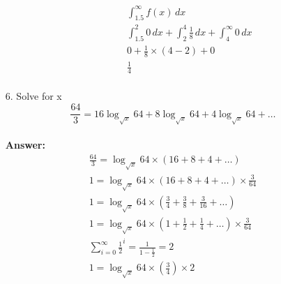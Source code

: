 \documentclass[a4paper]{article}
\begin{document}
\begin{itemize}
\begin{itemize}
\begin{itemize}
	      	      	      \begin{equation}
	      	      	      	\begin{split}
	      	      	      		\int_{1.5}^{\infty} f(x) \,dx \\
	      	      	      		\int_{1.5}^{2} 0 \,dx + \int_{2}^{4} \frac{1}{8} \,dx + \int_{4}^{\infty} 0 \,dx \\
	      	      	      		0 + \frac{1}{8} \times (4 - 2) + 0 \\
	      	      	      		\frac{1}{4} \\
	      	      	      	\end{split}
	      	      	      \end{equation}
	      	      \end{itemize}  
	      \end{itemize}
	\item[6.] Solve for x
	      \begin{equation}
	      	\frac{64}{3} = 16 \log_{\sqrt{x}} 64 + 8 \log_{\sqrt{x}} 64 + 4 \log_{\sqrt{x}} 64 + \ldots
	      \end{equation} \\
	      \textbf{Answer:}
	      \begin{equation}
	      	\begin{split}
	      		\frac{64}{3} = \log_{\sqrt{x}} 64 \times (16 + 8 + 4 + \ldots) \\
	      		1 = \log_{\sqrt{x}} 64 \times (16 + 8 + 4 + \ldots) \times \frac{3}{64} \\
	      		1 = \log_{\sqrt{x}} 64 \times (\frac{3}{4} + \frac{3}{8} + \frac{3}{16} + \ldots) \\
	      		1 = \log_{\sqrt{x}} 64 \times (1 + \frac{1}{2} + \frac{1}{4} + \ldots) \times \frac{3}{64} \\
	      		\sum_{i=0}^{\infty} \frac{1}{2}^{i} = \frac{1}{1 - \frac{1}{2}} = 2 \\
	      		1 = \log_{\sqrt{x}} 64 \times (\frac{3}{4}) \times 2 \\

\end{split}
\end{equation}
\end{itemize}
\end{document}
